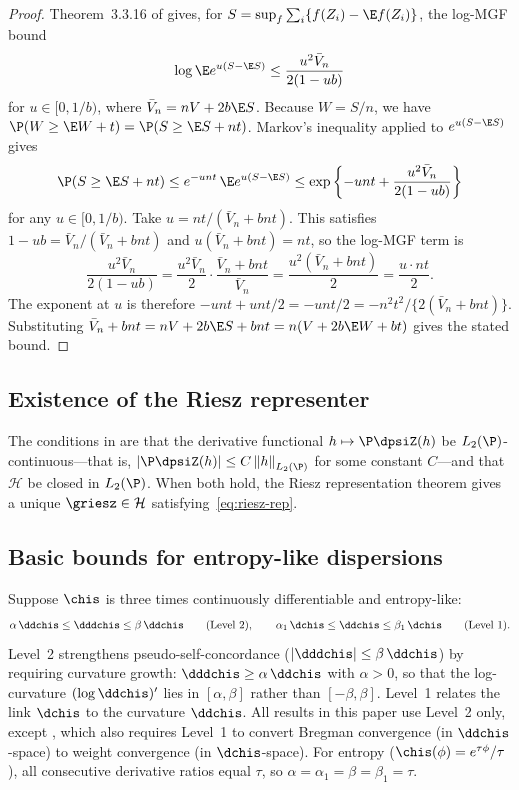 \documentclass{article}
\begin{document}
\begin{proof}
Theorem~3.3.16 of \citet{gine2016mathematical}
gives, for $S = \sup_f \sum_i \{f(Z_i) - \E f(Z_i)\}$,
the log-MGF bound
\[
\log \E e^{u(S - \E S)}
  \le \frac{u^2 \bar{V}_n}{2(1 - u b)}
\]
for $u \in [0, 1/b)$,
where $\bar{V}_n = nV + 2b\E S$.
Because $W = S/n$,
we have $\P(W \ge \E W + t) = \P(S \ge \E S + nt)$.
Markov's inequality applied to $e^{u(S - \E S)}$ gives
\[
\P(S \ge \E S + nt)
  \le e^{-u nt}\, \E e^{u(S - \E S)}
  \le \exp\qty{-u nt + \frac{u^2 \bar{V}_n}{2(1 - u b)}}
\]
for any $u \in [0, 1/b)$.
Take $u = nt / (\bar{V}_n + bnt)$.
This satisfies $1 - ub = \bar{V}_n/(\bar{V}_n + bnt)$
and $u(\bar{V}_n + bnt) = nt$,
so the log-MGF term is
\[
\frac{u^2 \bar{V}_n}{2(1-ub)}
  = \frac{u^2 \bar{V}_n}{2}
    \cdot \frac{\bar{V}_n + bnt}{\bar{V}_n}
  = \frac{u^2(\bar{V}_n + bnt)}{2}
  = \frac{u \cdot nt}{2}.
\]
The exponent at $u$ is therefore
$-u nt + u nt/2 = -u nt/2 = -n^2 t^2/\{2(\bar{V}_n + bnt)\}$.
Substituting $\bar{V}_n + bnt = nV + 2b\E S + bnt = n(V + 2b\E W + bt)$
gives the stated bound.
\end{proof}

\subsection{Existence of the Riesz representer}
\label{sec:riesz-existence}

The conditions in 
are that the derivative functional
$h \mapsto \P\dpsiZ(h)$ be $L_2(\P)$-continuous---that
is, $|\P\dpsiZ(h)| \le C\, \norm{h}_{L_2(\P)}$ for some constant $C$---and
that $\mathcal{H}$ be closed in $L_2(\P)$.
When both hold,
the Riesz representation theorem
\citep[Theorem~6.15]{folland1999real}
gives a unique $\griesz \in \mathcal{H}$
satisfying~\eqref{eq:riesz-rep}.

\subsection{Basic bounds for entropy-like dispersions}
\label{sec:e-type-basics}

Suppose $\chis$ is three times continuously differentiable
and entropy-like:
\begin{equation}
\label{eq:e-type}
\alpha\, \ddchis \le \dddchis \le \beta\, \ddchis
\qquad\text{(Level 2)},
\qquad
\alpha_1\, \dchis \le \ddchis \le \beta_1\, \dchis
\qquad\text{(Level 1)}.
\end{equation}
Level~2 strengthens pseudo-self-concordance
($|\dddchis| \le \beta\, \ddchis$)
by requiring curvature growth:
$\dddchis \ge \alpha\, \ddchis$ with $\alpha > 0$,
so that the log-curvature $(\log \ddchis)'$
lies in $[\alpha, \beta]$ rather than $[-\beta, \beta]$.
Level~1 relates the link $\dchis$
to the curvature $\ddchis$.
All results in this paper use Level~2 only,
except ,
which also requires Level~1
to convert Bregman convergence
(in $\ddchis$-space)
to weight convergence
(in $\dchis$-space).
For entropy ($\chis(\phi) = e^{\tau\phi}/\tau$),
all consecutive derivative ratios
equal $\tau$,
so $\alpha = \alpha_1 = \beta = \beta_1 = \tau$.
\end{document}
